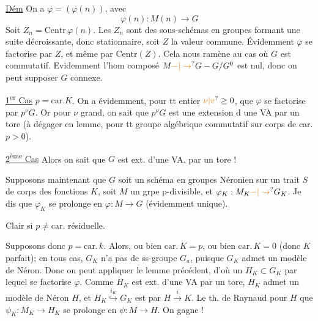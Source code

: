 \uline{Dém} On a $\varphi=(\varphi(n))$, avec
\[
\varphi(n):M(n)\longrightarrow G
\]
Soit $Z_n=\mathrm{Centr}\,\varphi(n)$. Les $Z_n$ sont des sous-schémas en groupes formant une suite décroissante,
donc stationnaire, soit $Z$ la valeur commune.
Évidemment $\varphi$ se factorise par  $Z$, et
même par $\mathrm{Centr}(Z)$. Cela nous ramène au
cas où $G$ est commutatif. Evidemment
 l'hom composé $M\unsure{-|\to}G-G/G^0$ est nul, donc
on peut supposer $G$ connexe.

\uline{1\textsuperscript{er} Cas} $p=\mathrm{car}. K$. On a évidemment, pour tt
entier $\unsure{\nu|v}\geq 0$, que $\varphi$ se factorise par $p^\nu G$.
Or pour $\nu$ grand, on sait  que $p^\nu G$ est
une extension d une VA par un tore (à dégager
en lemme, pour tt groupe algébrique commutatif
sur corps de car. $p>0$).

\uline{2\textsuperscript{ème} Cas}  
Alors on sait que $G$ est ext. d'une VA. par un tore !

Supposons maintenant que $G$ soit un schéma en
groupes Néronien sur un trait $S$ de corps des
fonctions $K$, soit $M$ un grpe p-divisible, et
$\varphi_K:M_K\unsure{-|\to}G_K$. Je dis que $\varphi_K$ se prolonge en
$\varphi:M\to G$ (évidemment unique).

Clair si $p\ne\mathrm{car}.$ résiduelle.

Supposons donc $p=\mathrm{car}.\,k$. Alors, ou bien $\mathrm{car}.\,K=p$,
ou bien $\mathrm{car}.\,K=0$ (donc $K$ parfait); en tous cas,
$G_K$ n'a pas de ss-groupe  $G_a$, puisque
$G_K$ admet un modèle de Néron. Donc on
peut appliquer le lemme précédent,  d'où
un $H_K\subset G_K$ par lequel se factorise $\varphi$.
Comme $H_K$ est ext. d'une VA par un tore,
$H_K$ admet un modèle de Néron $H$, et $H_K\overset{i_K}{\hookrightarrow}G_K$
est  par $H\xrightarrow{i}K$. Le th. de Raynaud
pour $H$  que $\psi_K:M_K\to H_K$ se
prolonge en $\psi:M\longrightarrow H$. On gagne !
